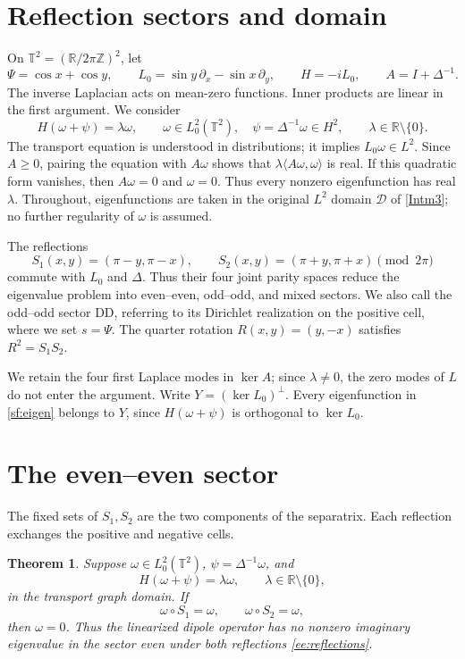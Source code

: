 \documentclass[reqno,11pt]{amsart}
\numberwithin{equation}{section}
\newtheorem{theorem}{Theorem}[section]
\theoremstyle{remark}
\begin{document}
\section{Reflection sectors and domain}\label{sec:spectral-foundations}
On $\mathbb T^2=(\mathbb R/2\pi\mathbb Z)^2$, let
\[
 \Psi=\cos x+\cos y,\qquad
 L_0=\sin y\,\partial_x-\sin x\,\partial_y,\qquad
 H=-iL_0,\qquad A=I+\Delta^{-1}.
\]
The inverse Laplacian acts on mean-zero functions. Inner products are
linear in the first argument. We consider
\begin{equation}\label{sf:eigen}
 H(\omega+\psi)=\lambda\omega,\qquad
 \omega\in L^2_0(\mathbb T^2),\quad \psi=\Delta^{-1}\omega\in H^2,
 \qquad \lambda\in\mathbb R\setminus\{0\}.
\end{equation}
The transport equation is understood in distributions; it implies
$L_0\omega\in L^2$. Since $A\ge0$, pairing the equation with
$A\omega$ shows that $\lambda\langle A\omega,\omega\rangle$ is real.
If this quadratic form vanishes, then $A\omega=0$ and
$\omega=0$. Thus every nonzero eigenfunction has real $\lambda$.
Throughout, eigenfunctions are taken in the original $L^2$ domain
$\mathcal D$ of \eqref{Intm3}; no further regularity of $\omega$ is
assumed.

The reflections
\begin{equation}\label{ee:reflections}
 S_1(x,y)=(\pi-y,\pi-x),\qquad
 S_2(x,y)=(\pi+y,\pi+x)\pmod {2\pi}
\end{equation}
commute with $L_0$ and $\Delta$. Thus their four joint parity spaces
reduce the eigenvalue problem into even--even, odd--odd, and mixed
sectors. We also call the odd--odd sector DD, referring to its
Dirichlet realization on the positive cell, where we set $s=\Psi$.
The quarter rotation $R(x,y)=(y,-x)$ satisfies $R^2=S_1S_2$.

We retain the four first Laplace modes in $\ker A$; since
$\lambda\ne0$, the zero modes of $L$ do not enter the argument. Write
$Y=(\ker L_0)^\perp$. Every eigenfunction in \eqref{sf:eigen} belongs
to $Y$, since $H(\omega+\psi)$ is orthogonal to $\ker L_0$.

\section{The even--even sector}
\label{sec:ee-exclusion}

The fixed sets of $S_1,S_2$ are the two components of the
separatrix. Each reflection exchanges the positive and negative cells.

\begin{theorem}\label{ee:theorem}
Suppose $\omega\in L^2_0(\mathbb T^2)$, $\psi=\Delta^{-1}\omega$, and
\begin{equation}\label{ee:eigen}
 H(\omega+\psi)=\lambda\omega,
 \qquad \lambda\in\mathbb R\setminus\{0\},
\end{equation}
in the transport graph domain. If
\[
 \omega\circ S_1=\omega,\qquad \omega\circ S_2=\omega,
\]
then $\omega=0$. Thus the linearized dipole operator has no nonzero
imaginary eigenvalue in the sector even under both reflections
\eqref{ee:reflections}.
\end{theorem}
\end{document}
